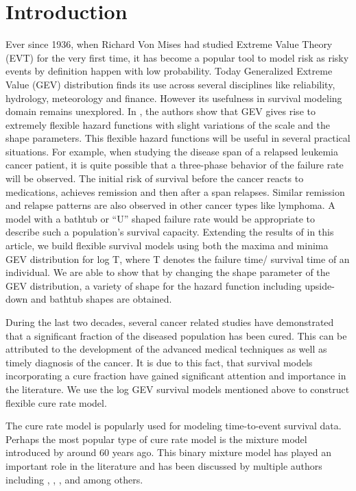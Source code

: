 \documentclass[smallextended]{svjour3}       %
\begin{document}
\section{Introduction}
\label{sec:intro}
Ever since 1936, when Richard Von Mises had studied Extreme Value Theory (EVT) for the very first time, it has become a popular tool to model risk as risky events by definition happen with low probability. Today Generalized Extreme Value (GEV) distribution finds its use across several disciplines like reliability, hydrology, meteorology and finance. However its usefulness in survival modeling domain remains unexplored. 
In \citet{roy:dey:2014}, the authors show that GEV gives rise to extremely flexible hazard functions with slight variations of the scale and the shape parameters. This flexible hazard functions will be useful in several practical situations. For example, when studying the disease span of a relapsed leukemia cancer patient, it is quite possible that a three-phase behavior of the failure rate will be observed. The initial risk of survival before the cancer reacts to medications, achieves remission and then after a span relapses. Similar remission and relapse patterns are also observed in other cancer types like lymphoma. A model with a bathtub or ``U''
shaped failure rate would be appropriate to describe such a  population's survival capacity. Extending the results of \citet{roy:dey:2014} in this article, we build flexible survival models using both the maxima and minima GEV distribution for log T, where T denotes the failure time/ survival time of an individual. We are able to show that by changing the shape parameter of the GEV distribution, a variety of shape for the hazard function including upside-down and bathtub shapes are obtained. 

During the last two decades, several cancer related studies have demonstrated
that a significant fraction of the diseased population has been cured.
This can be attributed to the development of the advanced medical techniques as well
as timely diagnosis of the cancer. It is due to this fact, that survival
models incorporating a cure fraction have gained significant attention and importance
in the literature. We use the log GEV survival models mentioned above to construct flexible cure rate model.


The cure rate model is popularly used for modeling time-to-event survival
data. Perhaps the most popular type of cure rate model is the mixture
model introduced by \citet{berk:gage:1952} around 60 years ago. 
This binary mixture model has played an important role in the literature and has been discussed by multiple authors
including \citet{farewell:1982}, \citet{kuk:chen:1992}, \citet{maller:zhou:1996},
 \citet{peng:dear:2000} and \citet{sy:taylor:2000} among others.
\end{document}
